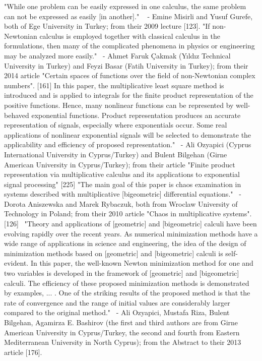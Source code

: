 \documentclass[12pt]{article}
\begin{document}
"While one problem can be easily expressed in one calculus, the same problem can not be expressed as easily [in another]."   - Emine Misirli and Yusuf Gurefe, both of Ege University in Turkey; from their 2009 lecture [123].
"If non-Newtonian calculus is employed together with classical calculus in the formulations, then many of the complicated phenomena in physics or engineering may be analyzed more easily."  - Ahmet Faruk Çakmak (Yıldız Technical University in Turkey) and Feyzi Basar (Fatih University in Turkey); from their 2014 article "Certain spaces of functions over the field of non-Newtonian complex numbers". [161]
In this paper, the multiplicative least square method is introduced and is applied to integrals for the finite product representation of the positive functions. Hence, many nonlinear functions can be represented by well-behaved exponential functions. Product representation produces an accurate representation of signals, especially where exponentials occur. Some real applications of nonlinear exponential signals will be selected to demonstrate the applicability and efficiency of proposed representation."  - Ali Ozyapici (Cyprus International University in Cyprus/Turkey) and Bulent Bilgehan (Girne American University in Cyprus/Turkey); from their article "Finite product representation via multiplicative calculus and its applications to exponential signal processing" [225]
"The main goal of this paper is chaos examination in systems described with multiplicative [bigeometric] differential equations."  - Dorota Aniszewska and Marek Rybaczuk, both from Wroclaw University of Technology in Poland; from their 2010 article "Chaos in multiplicative systems". [126] 
"Theory and applications of [geometric] and [bigeometric] calculi have been evolving rapidly over the recent years. As numerical minimization methods have a wide range of applications in science and engineering, the idea of the design of minimization methods based on [geometric] and [bigeometric] calculi is self-evident. In this paper, the well-known Newton minimization method for one and two variables is developed in the framework of [geometric] and [bigeometric] calculi. The efficiency of these proposed minimization methods is demonstrated by examples, ... . One of the striking results of the proposed method is that the rate of convergence and the range of initial values are considerably larger compared to the original method."  - Ali Ozyapici, Mustafa Riza, Bulent Bilgehan, Agamirza E. Bashirov (the first and third authors are from Girne American University in Cyprus/Turkey, the second and fourth from Eastern Mediterranean University in North Cyprus); from the Abstract to their 2013 article [176].
\end{document}
